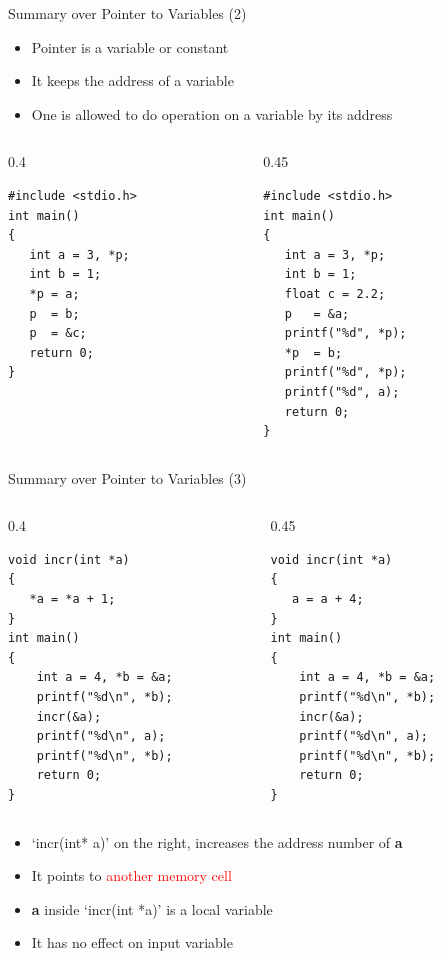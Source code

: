 \begin{frame}[fragile]{Summary over Pointer to Variables (2)}
\vspace{-0.15in}
\begin{itemize}
	\item {Pointer is a variable or constant}
    \item {It keeps the address of a variable}
    \item {One is allowed to do operation on a variable by its address}
\end{itemize}
\begin{columns}
\begin{column}{0.4\linewidth}
\begin{lstlisting}
#include <stdio.h>
int main()
{
   int a = 3, *p;
   int b = 1;
   *p = a;
   p  = b;
   p  = &c;
   return 0;
}
\end{lstlisting}
\end{column}
\begin{column}{0.45\linewidth}
\begin{lstlisting}
#include <stdio.h>
int main()
{
   int a = 3, *p;
   int b = 1;
   float c = 2.2;
   p   = &a;
   printf("%d", *p);
   *p  = b;
   printf("%d", *p);
   printf("%d", a);
   return 0;
}
\end{lstlisting}
\end{column}
\end{columns}
\end{frame}

\begin{frame}[fragile]{Summary over Pointer to Variables (3)}
\vspace{-0.03in}
\begin{columns}
\begin{column}{0.4\linewidth}
\begin{lstlisting}
void incr(int *a)
{
   *a = *a + 1;
}
int main()
{
	int a = 4, *b = &a;
	printf("%d\n", *b);
	incr(&a);
	printf("%d\n", a);
	printf("%d\n", *b);
	return 0;
}
\end{lstlisting}
\end{column}
\begin{column}{0.45\linewidth}
\begin{lstlisting}
void incr(int *a)
{
   a = a + 4;
}
int main()
{
	int a = 4, *b = &a;
	printf("%d\n", *b);
	incr(&a);
	printf("%d\n", a);
	printf("%d\n", *b);
	return 0;
}
\end{lstlisting}
\end{column}
\end{columns}
\begin{itemize}
	\item {`incr(int* a)' on the right, increases the address number of \textbf{a}}
    \item {It points to \textcolor{red}{another memory cell}}
    \item {\textbf{a} inside `incr(int *a)' is a local variable}
    \item {It has no effect on input variable}
\end{itemize}
\end{frame}

